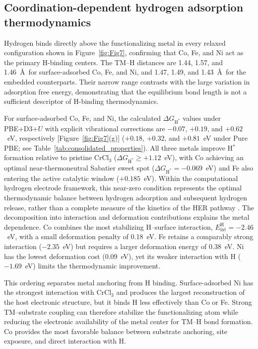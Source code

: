 \documentclass[journal=jacsat,manuscript=article]{achemso}
\begin{document}
\subsection{Coordination-dependent hydrogen adsorption thermodynamics}

\noindent Hydrogen binds directly above the functionalizing metal in every relaxed configuration shown in Figure~\ref{fig:Fig7}, confirming that Co, Fe, and Ni act as the primary H-binding centers. The TM--H distances are 1.44, 1.57, and 1.46~\AA\ for surface-adsorbed Co, Fe, and Ni, and 1.47, 1.49, and 1.43~\AA\ for the embedded counterparts. Their narrow range contrasts with the large variation in adsorption free energy, demonstrating that the equilibrium bond length is not a sufficient descriptor of H-binding thermodynamics.

{\color{revcolor}%
  For surface-adsorbed Co, Fe, and Ni, the calculated $\Delta G_{\mathrm{H}^*}$ values under PBE+D3+$U$ with explicit vibrational corrections are $-0.07$, $+0.19$, and $+0.62$~eV, respectively [Figure~\ref{fig:Fig7}(g)] ($+0.18$, $+0.32$, and $+0.81$~eV under Pure PBE; see Table~\ref{tab:consolidated_properties}). All three metals improve H$^*$ formation relative to pristine CrCl$_3$ ($\Delta G_{\mathrm{H}^*} \ge +1.12$~eV), with Co achieving an optimal near-thermoneutral Sabatier sweet spot ($\Delta G_{\mathrm{H}^*} = -0.069$~eV) and Fe also entering the active catalytic window ($+0.185$~eV). Within the computational hydrogen electrode framework, this near-zero condition represents the optimal thermodynamic balance between hydrogen adsorption and subsequent hydrogen release, rather than a complete measure of the kinetics of the HER pathway \cite{Norskov_2005,Liao2022}. The decomposition into interaction and deformation contributions explains the metal dependence. Co combines the most stabilizing H--surface interaction, $E_{\mathrm{int}}^{\mathrm H}=-2.46$~eV, with a small deformation penalty of 0.18~eV. Fe retains a comparably strong interaction ($-2.35$~eV) but requires a larger deformation energy of 0.38~eV. Ni has the lowest deformation cost (0.09~eV), yet its weaker interaction with H ($-1.69$~eV) limits the thermodynamic improvement.
\par}

This ordering separates metal anchoring from H binding. Surface-adsorbed Ni has the strongest interaction with CrCl$_3$ and produces the largest reconstruction of the host electronic structure, but it binds H less effectively than Co or Fe. Strong TM--substrate coupling can therefore stabilize the functionalizing atom while reducing the electronic availability of the metal center for TM--H bond formation. Co provides the most favorable balance between substrate anchoring, site exposure, and direct interaction with H.
\end{document}
